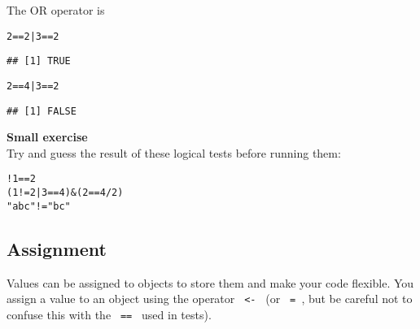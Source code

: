 \documentclass[12pt,a4paper]{scrartcl}\usepackage[]{graphicx}\usepackage[]{color}
\makeatletter
\newcommand{\hlnum}[1]{\textcolor[rgb]{0.686,0.059,0.569}{#1}}%
\newcommand{\hlstr}[1]{\textcolor[rgb]{0.192,0.494,0.8}{#1}}%
\newcommand{\hlopt}[1]{\textcolor[rgb]{0,0,0}{#1}}%
\newcommand{\hlstd}[1]{\textcolor[rgb]{0.345,0.345,0.345}{#1}}%
\newenvironment{kframe}{%
 \def\at@end@of@kframe{}%
 \ifinner\ifhmode%
  \def\at@end@of@kframe{\end{minipage}}%
  \begin{minipage}{\columnwidth}%
 \fi\fi%
 \def\FrameCommand##1{\hskip\@totalleftmargin \hskip-\fboxsep
 \colorbox{shadecolor}{##1}\hskip-\fboxsep
     \hskip-\linewidth \hskip-\@totalleftmargin \hskip\columnwidth}%
 \MakeFramed {\advance\hsize-\width
   \@totalleftmargin\z@ \linewidth\hsize
   \@setminipage}}%
 {\par\unskip\endMakeFramed%
 \at@end@of@kframe}
\newenvironment{knitrout}{}{} %
\makeatother
\begin{document}
The OR operator is \texttt{\textbar}
\begin{knitrout}
\color{fgcolor}\begin{kframe}
\begin{alltt}
\hlnum{2} \hlopt{==} \hlnum{2} \hlopt{|} \hlnum{3}\hlopt{==}\hlnum{2}
\end{alltt}
\begin{verbatim}
## [1] TRUE
\end{verbatim}
\begin{alltt}
\hlnum{2} \hlopt{==} \hlnum{4} \hlopt{|} \hlnum{3}\hlopt{==}\hlnum{2}
\end{alltt}
\begin{verbatim}
## [1] FALSE
\end{verbatim}
\end{kframe}
\end{knitrout}

\begin{mdframed}
\textbf{Small exercise}\\
Try and guess the result of these logical tests before running them:
\begin{knitrout}
\color{fgcolor}\begin{kframe}
\begin{alltt}
\hlopt{!} \hlnum{1}\hlopt{==}\hlnum{2}
\hlstd{(}\hlnum{1}\hlopt{!=}\hlnum{2} \hlopt{|} \hlnum{3}\hlopt{==}\hlnum{4}\hlstd{)} \hlopt{&} \hlstd{(}\hlnum{2}\hlopt{==}\hlnum{4}\hlopt{/}\hlnum{2}\hlstd{)}
\hlstr{"abc"} \hlopt{!=} \hlstr{"bc"}
\end{alltt}
\end{kframe}
\end{knitrout}
\end{mdframed}

\subsection{Assignment}
Values can be assigned to objects to store them and make your code flexible. You assign a value to an object using the operator \verb+ <- + (or \verb+ = +, but be careful not to confuse this with the \verb+ == + used in tests).
\end{document}
